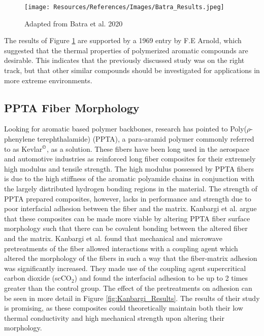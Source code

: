 \documentclass[12pt]{article}
\begin{document}
\begin{multicols}{2}
\begin{figure}[H]
    \centering
    \texttt{[image: Resources/References/Images/Batra\_Results.jpeg]}
    \caption{\scriptsize{Adapted from Batra et al. 2020 \citep{Batra2020}}}
    \label{fig:Batra_Results}
\end{figure}

\indent The results of Figure \ref{fig:Batra_Results} are supported by a 1969 entry by F.E Arnold, which suggested that the thermal properties of polymerized aromatic compounds are desirable. \citep{Arnold1969} This indicates that the previously discussed study was on the right track, but that other similar compounds should be investigated for applications in more extreme environments.

\subsection{PPTA Fiber Morphology}

\vspace{-0.4em}

\indent Looking for aromatic based polymer backbones, research has pointed to Poly($\rho$-phenylene terephthalamide) (PPTA), a para-aramid polymer commonly referred to as Kevlar$^{\text{\textcopyright}}$, as a solution. \citep{Liu2019} These fibers have been long used in the aerospace and automotive industries as reinforced long fiber composites for their extremely high modulus and tensile strength. \cite{Cheng2005} The high modulus possessed by PPTA fibers is due to the high stiffness of the aromatic polyamide chains in conjunction with the largely distributed hydrogen bonding regions in the material. \citep{Wang2020} The strength of PPTA prepared composites, however, lacks in performance and strength due to poor interfacial adhesion between the fiber and the matrix. \citep{Kanbargi2017} Kanbargi et al. \citep{Kanbargi2017} argue that these composites can be made more viable by altering PPTA fiber surface morphology such that there can be covalent bonding between the altered fiber and the matrix. Kanbargi et al. found that mechanical and microwave pretreatments of the fiber allowed interactions with a coupling agent which altered the morphology of the fibers in such a way that the fiber-matrix adhesion was significantly increased. They made use of the coupling agent supercritical carbon dioxide (scCO$_2$) and found the interfacial adhesion to be up to 2 times greater than the control group. \citep{Kanbargi2017} The effect of the pretreatments on adhesion can be seen in more detail in Figure \ref{fig:Kanbargi_Results}. The results of their study is promising, as these composites could theoretically maintain both their low thermal conductivity and high mechanical strength upon altering their morphology.


\end{multicols}
\end{document}
